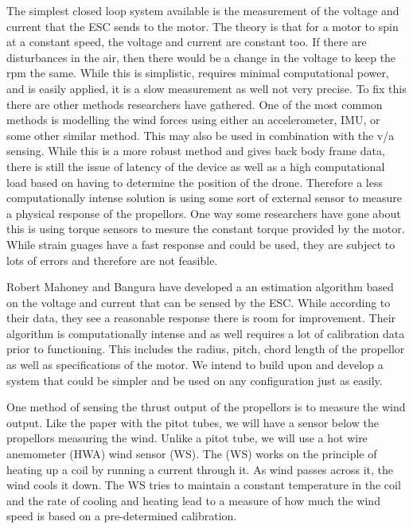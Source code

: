 \documentclass[twocolumn]{article}
\begin{document}
The simplest closed loop system available is the measurement of the voltage and current that the ESC sends to the motor. The theory is that for a motor to spin at a constant speed, the voltage and current are constant too. If there are disturbances in the air, then there would be a change in the voltage to keep the rpm the same. While this is simplistic, requires minimal computational power, and is easily applied,  it is a slow measurement as well not very precise. To fix this there are other methods researchers have gathered. One of the most common methods is modelling the wind forces using either an accelerometer, IMU, or some other similar method. This may also be used in combination with the v/a sensing. While this is a more robust method and gives back body frame data, there is still the issue of latency of the device as well as a high computational load based on having to determine the position of the drone. Therefore a less computationally intense solution is using some sort of external sensor to measure a physical response of the propellors. One way some researchers have gone about this is using torque sensors to mesure the constant torque provided by the motor. While strain guages have a fast response and could be used, they are subject to lots of errors and therefore are not feasible. 

Robert Mahoney and Bangura have developed a an estimation algorithm based on the voltage and current that can be sensed by the ESC. While according to their data, they see a reasonable response there is room for improvement. Their algorithm is computationally intense and as well requires a lot of calibration data prior to functioning. This includes the radius, pitch, chord length of the propellor as well as specifications of the motor. We intend to build upon and develop a system that could be simpler and be used on any configuration just as easily. 

One method of sensing the thrust output of the propellors is to measure the wind output. Like the paper with the pitot tubes, we will have a sensor below the propellors measuring the wind. Unlike a pitot tube, we will use a hot wire anemometer (HWA) wind sensor (WS). The (WS) works on the principle of heating up a coil by running a current through it. As wind passes across it, the wind cools it down. The WS tries to maintain a constant temperature in the coil and the rate of cooling and heating lead to a measure of how much the wind speed is based on a pre-determined calibration. 
\end{document}
